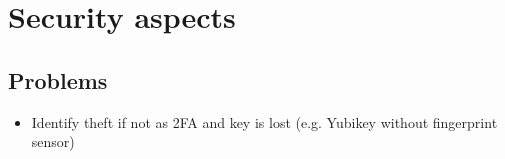 \section{Security aspects}

\subsection{Problems}

\begin{itemize}
	\item Identify theft if not as 2FA and key is lost (e.g. Yubikey without fingerprint sensor)
\end{itemize}
